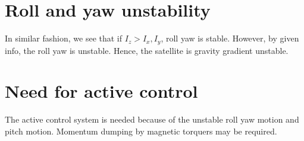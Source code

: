 \documentclass[10pt,a4paper]{report}
\begin{document}
\section{Roll and yaw unstability}
In similar fashion, we see that if $ I_{z}>I_{x},I_{y} $, roll yaw is stable. However, by given info, the roll yaw is unstable. Hence, the satellite is gravity gradient unstable. 
\section{Need for active control}
The active control system is needed because of the unstable roll yaw motion and pitch motion. Momentum dumping by magnetic torquers may be required.
\end{document}
